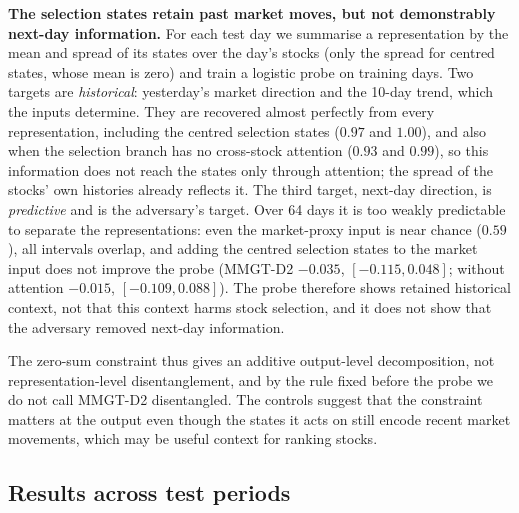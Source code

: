 \documentclass[conference]{IEEEtran}
\begin{document}
\textbf{The selection states retain past market moves, but not demonstrably
next-day information.} For each test day we summarise a representation by the mean
and spread of its states over the day's stocks (only the spread for centred states,
whose mean is zero) and train a logistic probe on training days. Two targets are
\emph{historical}: yesterday's market direction and the 10-day trend, which the
inputs determine. They are recovered almost perfectly from every representation,
including the centred selection states ($0.97$ and $1.00$), and also when the
selection branch has no cross-stock attention ($0.93$ and $0.99$), so this
information does not reach the states only through attention; the spread of the
stocks' own histories already reflects it. The third target, next-day direction, is
\emph{predictive} and is the adversary's target. Over 64 days it is too weakly
predictable to separate the representations: even the market-proxy input is near
chance ($0.59$), all intervals overlap, and adding the centred selection states to
the market input does not improve the probe (MMGT-D2 $-0.035$, $[-0.115, 0.048]$;
without attention $-0.015$, $[-0.109, 0.088]$). The probe therefore shows retained
historical context, not that this context harms stock selection, and it does not
show that the adversary removed next-day information.

The zero-sum constraint thus gives an additive output-level decomposition, not
representation-level disentanglement, and by the rule fixed before the probe we do
not call MMGT-D2 disentangled. The controls suggest that the constraint matters at
the output even though the states it acts on still encode recent market movements,
which may be useful context for ranking stocks.

\subsection{Results across test periods}
\end{document}
